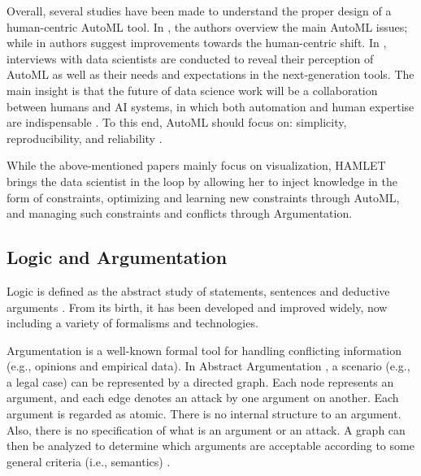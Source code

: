 Overall, several studies have been made to understand the proper design of a human-centric AutoML tool.
In \cite{pfisterer2019towards}, the authors overview the main AutoML issues; while in \cite{khuat2022roles} authors suggest improvements towards the human-centric shift.
In \cite{gil2019towards, XinWLSP21automationml, crisan2021fits}, interviews with data scientists are conducted to reveal their perception of AutoML as well as their needs and expectations in the next-generation tools.
The main insight is that the future of data science work will be a collaboration between humans and AI systems, in which both automation and human expertise are indispensable \cite{wang2019human}.
To this end, AutoML should focus on: simplicity, reproducibility, and reliability \cite{XinWLSP21automationml, crisan2021fits}.

While the above-mentioned papers mainly focus on visualization, HAMLET brings the data scientist in the loop by allowing her to inject knowledge in the form of constraints, optimizing and learning new constraints through AutoML, and managing such constraints and conflicts through Argumentation.

\subsection{Logic and Argumentation}\label{logic}
Logic is defined as the abstract study of statements, sentences and deductive arguments \cite{Paulson2018logichistory}.
From its birth, it has been developed and improved widely, now including a variety of formalisms and technologies.

Argumentation is a well-known formal tool for handling conflicting information (e.g., opinions and empirical data).
In Abstract Argumentation \cite{Dung1995abstractArg}, a scenario (e.g., a legal case) can be represented by a directed graph.
Each node represents an argument, and each edge denotes an attack by one argument on another. Each argument is regarded as atomic. There is no internal structure to an argument. Also, there is no specification of what is an argument or an attack. A graph can then be analyzed to determine which arguments are acceptable according to some general criteria (i.e., semantics) \cite{baroniCG11semantics}.

